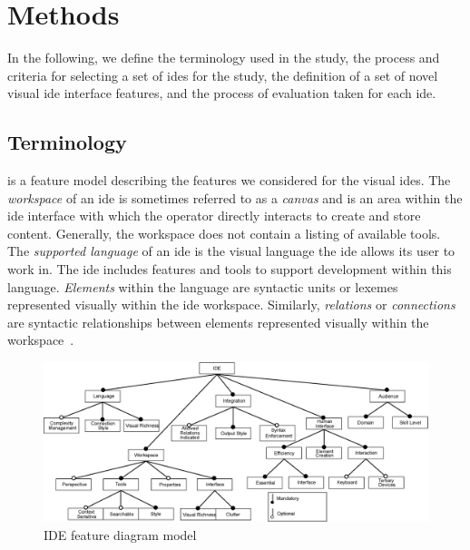 \section{Methods} \label{sec:methods}

In the following, we define the terminology used in the study, the process and criteria for selecting a set of \acp{ide} for the study, the definition of a set of novel visual \ac{ide} interface features, and the process of evaluation taken for each \ac{ide}.


\subsection{Terminology} \label{subsec:terminology}

 is a feature model describing the features we considered for the visual \acp{ide}.
The \emph{workspace} of an \ac{ide} is sometimes referred to as a
\emph{canvas} and is an area within the \ac{ide} interface with which the
operator directly interacts to create and store content. Generally, the
workspace does not contain a listing of available tools. The \emph{supported
language} of an \ac{ide} is the visual language the \ac{ide} allows its
user to work in. The \ac{ide} includes features and tools to support
development within this language. \emph{Elements} within the language are
syntactic units or lexemes represented visually within the \ac{ide}
workspace. Similarly, \emph{relations} or \emph{connections} are syntactic
relationships between elements represented visually within the workspace~\cite{costagliola2002}.
%
\begin{figure}
  \centering
  \includegraphics[width=\textwidth]{images/ide_feature_model}
  \caption{IDE feature diagram model}
  \label{fig:featuremodel}
\end{figure}


